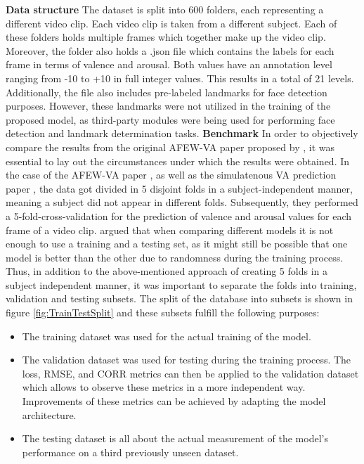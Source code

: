 \newline\newline
\textbf{Data structure}\newline
The dataset is split into 600 folders, each representing a different video clip. Each video clip is taken from a different subject. Each of these folders holds multiple frames which together make up the video clip. Moreover, the folder also holds a .json file which contains the labels for each frame in terms of valence and arousal. Both values have an annotation level ranging from -10 to +10 in full integer values. This results in a total of 21 levels.\citep{Kossaifi:2017:AFEW-VADatabase} 
\newline\newline
Additionally, the file also includes pre-labeled landmarks for face detection purposes. However, these landmarks were not utilized in the training of the proposed model, as third-party modules were being used for performing face detection and landmark determination tasks.
\newline\newline
\textbf{Benchmark}
\newline
In order to objectively compare the results from the original AFEW-VA paper proposed by \citet{Kossaifi:2017:AFEW-VADatabase}, it was essential to lay out the circumstances under which the results were obtained. In the case of the AFEW-VA paper \citep{Kossaifi:2017:AFEW-VADatabase}, as well as the simulatenous VA prediction paper \citep{Handrich:2020:SimultaneousPredVA}, the data got divided in 5 disjoint folds in a subject-independent manner, meaning a subject did not appear in different folds. Subsequently, they performed a 5-fold-cross-validation for the prediction of valence and arousal values for each frame of a video clip.
\newline\newline
\citet{Roehrich:2020:TrainValidateTest} argued that when comparing different models it is not enough to use a training and a testing set, as it might still be possible that one model is better than the other due to randomness during the training process. Thus, in addition to the above-mentioned approach of creating 5 folds in a subject independent manner, it was important to separate the folds into training, validation and testing subsets. The split of the database into subsets is shown in figure \ref{fig:TrainTestSplit} and these subsets fulfill the following purposes:

\begin{itemize}
    \item The training dataset was used for the actual training of the model.
    \item The validation dataset was used for testing during the training process. The loss, RMSE, and CORR metrics can then be applied to the validation dataset which allows to observe these metrics in a more independent way. Improvements of these metrics can be achieved by adapting the model architecture. 
    \item The testing dataset is all about the actual measurement of the model's performance on a third previously unseen dataset.
\end{itemize}

